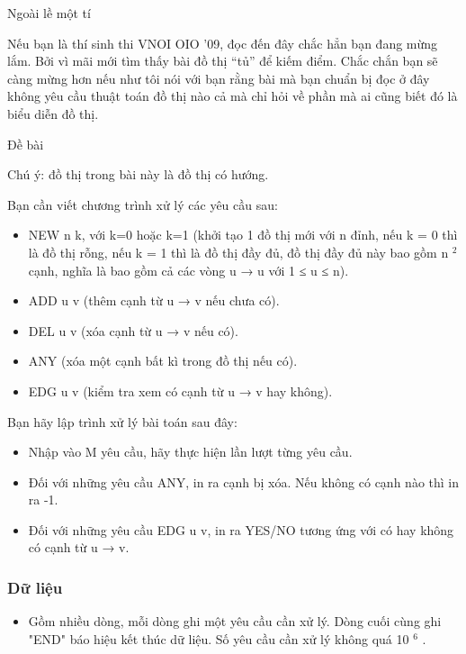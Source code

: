 



       Ngoài lề một tí     

   Nếu bạn là thí sinh thi VNOI OIO '09, đọc đến đây chắc hẳn bạn đang mừng lắm. Bởi vì mãi mới tìm thấy bài đồ thị “tủ” để kiếm điểm. Chắc chắn bạn sẽ càng mừng hơn nếu như tôi nói với bạn rằng bài mà bạn chuẩn bị đọc ở đây không yêu cầu thuật toán đồ thị nào cả mà chỉ hỏi về phần mà ai cũng biết đó là biểu diễn đồ thị.  

       Đề bài     

   Chú ý: đồ thị trong bài này là đồ thị có hướng.  

   Bạn cần viết chương trình xử lý các yêu cầu sau:  
\begin{itemize}
	\item     NEW n k, với k=0 hoặc k=1 (khởi tạo 1 đồ thị mới với n đỉnh, nếu k = 0 thì là đồ thị rỗng, nếu k = 1 thì là đồ thị đầy đủ, đồ thị đầy đủ này bao gồm n    $^     2    $    cạnh, nghĩa là bao gồm cả các vòng u → u với 1 ≤ u ≤ n).   
	\item     ADD u v (thêm cạnh từ u → v nếu chưa có).   
	\item     DEL u v (xóa cạnh từ u → v nếu có).   
	\item     ANY (xóa một cạnh bất kì trong đồ thị nếu có).   
	\item     EDG u v (kiểm tra xem có cạnh từ u → v hay không).   
\end{itemize}

   Bạn hãy lập trình xử lý bài toán sau đây:  
\begin{itemize}
	\item     Nhập vào M yêu cầu, hãy thực hiện lần lượt từng yêu cầu.   
	\item     Đối với những yêu cầu ANY, in ra cạnh bị xóa. Nếu không có cạnh nào thì in ra -1.   
	\item     Đối với những yêu cầu EDG u v, in ra YES/NO tương ứng với có hay không có cạnh từ u → v.   
\end{itemize}

\subsubsection{   Dữ liệu  }
\begin{itemize}
	\item     Gồm nhiều dòng, mỗi dòng ghi một yêu cầu cần xử lý. Dòng cuối cùng ghi "END" báo hiệu kết thúc dữ liệu. Số yêu cầu cần xử lý không quá 10    $^     6    $    .   
\end{itemize}

